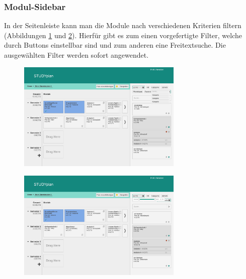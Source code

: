 \subsubsection{Modul-Sidebar}
\label{subsec:gui-modul-sidebar}
In der Seitenleiste kann man die Module nach verschiedenen Kriterien filtern (Abbildungen \ref{fig:gui-module-filtern-1} und \ref{fig:gui-module-filtern-2}). Hierfür gibt es zum einen vorgefertigte Filter, welche durch Buttons einstellbar sind und zum anderen eine Freitextsuche. Die ausgewählten Filter werden sofort angewendet.
\begin{figure}[!htb]
	\caption{}
	\label{fig:gui-module-filtern-1}
	\centering
	\includegraphics[width=0.7\textwidth]{../GUI/ergebnisse/module-filtern-1.png}
\end{figure}
\begin{figure}[!htb]
	\caption{}
	\label{fig:gui-module-filtern-2}
	\centering
	\includegraphics[width=0.7\textwidth]{../GUI/ergebnisse/module-filtern-2.png}
\end{figure}

